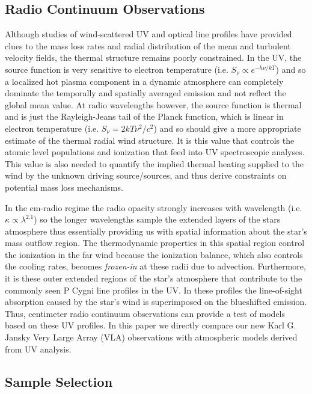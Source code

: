 \documentclass[iop]{emulateapj}
\begin{document}
\subsection{Radio Continuum Observations} \label{intro1} 

Although studies of wind-scattered UV and optical line profiles have provided clues to the mass loss rates and radial distribution of the mean and turbulent velocity fields, the thermal structure remains poorly constrained. In the UV, the source function is very sensitive to electron temperature (i.e. $S_{\nu} \propto e^{-h\nu /kT}$) and so a localized hot plasma component in a dynamic atmosphere can completely dominate the temporally and spatially averaged emission and not reflect the global mean value. At radio wavelengths however, the source function is thermal and is just the Rayleigh-Jeans tail of the Planck function, which is linear in electron temperature (i.e. $S_{\nu} = {2kT\nu ^2 /c^2}$) and so should give a more appropriate estimate of the thermal radial wind structure. It is this value that controls the atomic level populations and ionization that feed into UV spectroscopic analyses. This value is also needed to quantify the implied thermal heating supplied to the  wind by the unknown driving source/sources, and thus derive constraints on potential mass loss mechanisms.

In the cm-radio regime the radio opacity strongly increases with wavelength (i.e. $ \kappa \propto \lambda ^{2.1}$) so the longer wavelengths sample the extended layers of the stars atmosphere thus essentially providing us with spatial information about the star's mass outflow region. The thermodynamic properties in this spatial region control the ionization in the far wind because the ionization balance, which also controls the cooling rates, becomes \textit{frozen-in} at these radii due to advection. Furthermore, it is these outer extended regions of the star's atmosphere that contribute to the commonly seen P Cygni line profiles in the UV. In these profiles the line-of-sight absorption caused by the star's wind is superimposed on the blueshifted emission. Thus, centimeter radio continuum observations can provide a test of models based on these UV profiles. In this paper we directly compare our new Karl G. Jansky Very Large Array (VLA) observations with atmospheric models derived from UV analysis.

\subsection{Sample Selection} \label{intro2}
\end{document}

